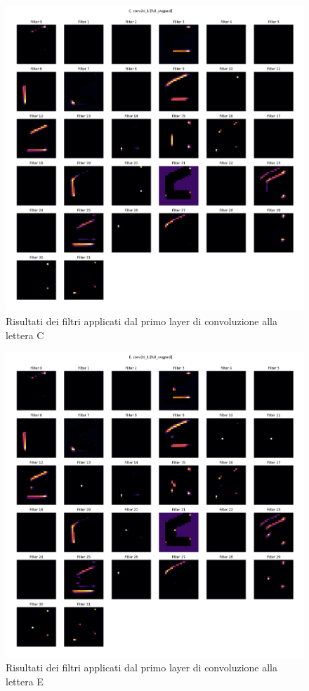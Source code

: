 \documentclass[a4paper,12pt]{article}
\begin{document}
\begin{figure}[H]
\centering
\includegraphics[width=1\linewidth]{images/C_full_avgpool_layer_0.png}
\caption{Risultati dei filtri applicati dal primo layer di convoluzione alla lettera C}
\label{first_layer_filters_C}
\end{figure}

\begin{figure}[H]
\centering
\includegraphics[width=1\linewidth]{images/E_full_avgpool_layer_0.png}
\caption{Risultati dei filtri applicati dal primo layer di convoluzione alla lettera E}
\label{first_layer_filters_E}
\end{figure}
\end{document}
